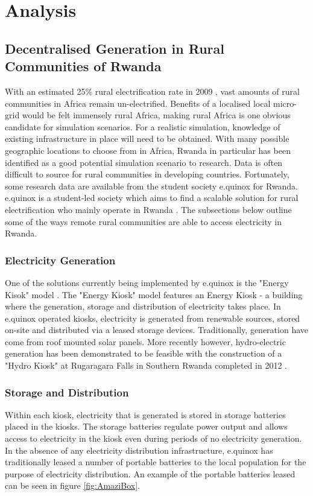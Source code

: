 \chapter*{Analysis}
\label{Analysis}

\section*{Decentralised Generation in Rural Communities of Rwanda}
With an estimated 25\% rural electrification rate in 2009 \cite{IEA-web:2015}, vast amounts of rural communities in Africa remain un-electrified. Benefits of a localised local micro-grid would be felt immensely rural Africa, making rural Africa is one obvious candidate for simulation scenarios. For a realistic simulation, knowledge of existing infrastructure in place will need to be obtained. With many possible geographic locations to choose from in Africa, Rwanda in particular has been identified as a good potential simulation scenario to research. Data is often difficult to source for rural communities in developing countries. Fortunately, some research data are available from the student society e.quinox for Rwanda. e.quinox is a student-led society which aims to find a scalable solution for rural electrification who mainly operate in Rwanda \cite{e.quinox-web:2015}. The subsections below outline some of the ways remote rural communities are able to access electricity in Rwanda.

\subsection*{Electricity Generation}
One of the solutions currently being implemented by e.quinox is the "Energy Kisok" model \cite{e.quinox-EK-web:2015}. The "Energy Kiosk" model features an Energy Kiosk - a building where the generation, storage and distribution of electricity takes place. In e.quinox operated kiosks, electricity is generated from renewable sources, stored on-site and distributed via a leased storage devices. Traditionally, generation have come from roof mounted solar panels. More recently however, hydro-electric generation has been demonstrated to be feasible with the construction of a "Hydro Kiosk" at Rugaragara Falls in Southern Rwanda completed in 2012 \cite{e.quinox-Hydro-web:2015}.

\subsection*{Storage and Distribution}
Within each kiosk, electricity that is generated is stored in storage batteries placed in the kiosks. The storage batteries regulate power output and allows access to electricity in the kiosk even during periods of no electricity generation.
In the absence of any electricity distribution infrastructure, e.quinox has traditionally leased a number of portable batteries to the local population for the purpose of electricity distribution. An example of the portable batteries leased can be seen in figure \ref{fig:AmaziBox}.

